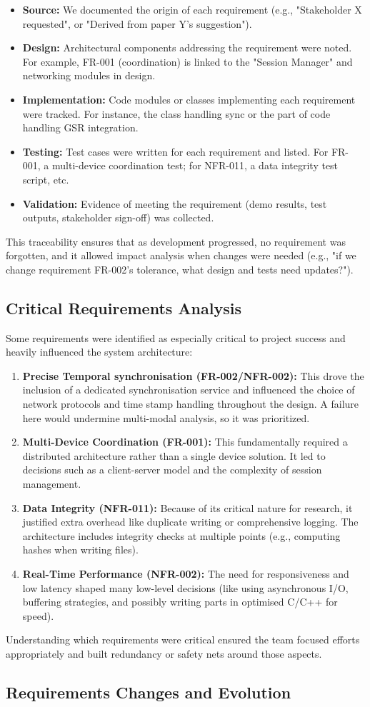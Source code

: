 \documentclass[11pt,a4paper]{report}
\begin{document}
\begin{itemize}
\item \textbf{Source:} We documented the origin of each requirement (e.g., "Stakeholder X requested", or "Derived from paper Y's suggestion").
\item \textbf{Design:} Architectural components addressing the requirement were noted. For example, FR-001 (coordination) is linked to the "Session Manager" and networking modules in design.
\item \textbf{Implementation:} Code modules or classes implementing each requirement were tracked. For instance, the class handling sync or the part of code handling GSR integration.
\item \textbf{Testing:} Test cases were written for each requirement and listed. For FR-001, a multi-device coordination test; for NFR-011, a data integrity test script, etc.
\item \textbf{Validation:} Evidence of meeting the requirement (demo results, test outputs, stakeholder sign-off) was collected.
\end{itemize} This traceability ensures that as development progressed, no requirement was forgotten, and it allowed impact analysis when changes were needed (e.g., "if we change requirement FR-002's tolerance, what design and tests need updates?"). \subsection{Critical Requirements Analysis}
Some requirements were identified as especially critical to project success and heavily influenced the system architecture:
\begin{enumerate}
\item \textbf{Precise Temporal synchronisation (FR-002/NFR-002):} This drove the inclusion of a dedicated synchronisation service and influenced the choice of network protocols and time stamp handling throughout the design. A failure here would undermine multi-modal analysis, so it was prioritized.
\item \textbf{Multi-Device Coordination (FR-001):} This fundamentally required a distributed architecture rather than a single device solution. It led to decisions such as a client-server model and the complexity of session management.
\item \textbf{Data Integrity (NFR-011):} Because of its critical nature for research, it justified extra overhead like duplicate writing or comprehensive logging. The architecture includes integrity checks at multiple points (e.g., computing hashes when writing files).
\item \textbf{Real-Time Performance (NFR-002):} The need for responsiveness and low latency shaped many low-level decisions (like using asynchronous I/O, buffering strategies, and possibly writing parts in optimised C/C++ for speed).
\end{enumerate} Understanding which requirements were critical ensured the team focused efforts appropriately and built redundancy or safety nets around those aspects. \subsection{Requirements Changes and Evolution}
\end{document}
